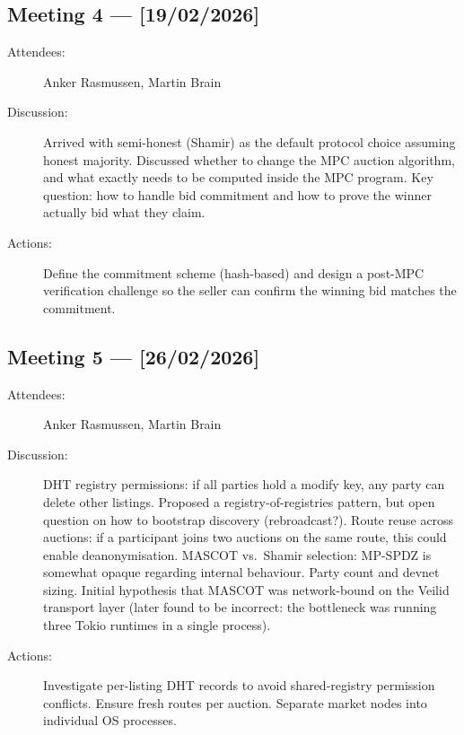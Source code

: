 \subsection*{Meeting 4 — [19/02/2026]}
\begin{description}
  \item[Attendees:] Anker Rasmussen, Martin Brain
  \item[Discussion:] Arrived with semi-honest (Shamir) as the default
    protocol choice assuming honest majority.  Discussed whether to change
    the MPC auction algorithm, and what exactly needs to be computed inside
    the MPC program.  Key question: how to handle bid commitment and how to
    prove the winner actually bid what they claim.
  \item[Actions:] Define the commitment scheme (hash-based) and design a
    post-MPC verification challenge so the seller can confirm the winning
    bid matches the commitment.
\end{description}
\subsection*{Meeting 5 — [26/02/2026]}
\begin{description}
  \item[Attendees:] Anker Rasmussen, Martin Brain
  \item[Discussion:] DHT registry permissions: if all parties hold a modify
    key, any party can delete other listings.  Proposed a registry-of-registries
    pattern, but open question on how to bootstrap discovery (rebroadcast?).
    Route reuse across auctions: if a participant joins two auctions on the
    same route, this could enable deanonymisation.  MASCOT vs.\ Shamir
    selection: MP-SPDZ is somewhat opaque regarding internal behaviour.
    Party count and devnet sizing.  Initial hypothesis that MASCOT was
    network-bound on the Veilid transport layer (later found to be incorrect:
    the bottleneck was running three Tokio runtimes in a single process).
  \item[Actions:] Investigate per-listing DHT records to avoid shared-registry
    permission conflicts.  Ensure fresh routes per auction.  Separate market
    nodes into individual OS processes.
\end{description}
